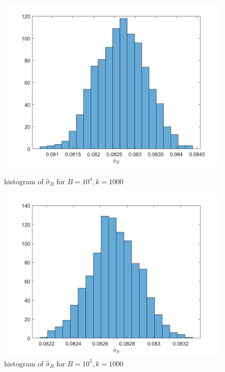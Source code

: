 \documentclass[10pt]{article}
\begin{document}
\begin{figure}[H]
    \begin{minipage}[b]{0.47\linewidth}
            \centering
            \includegraphics[width=\textwidth]{files/q3,b=10^4.png}
            \caption{histogram of $\hat{\sigma}_B$ for $B=10^4,k=1000$}
        \end{minipage}
        \hfill
        \begin{minipage}[b]{0.47\linewidth}
            \centering
            \includegraphics[width=\textwidth]{files/q3,b=10^5.png}
            \caption{histogram of $\hat{\sigma}_B$ for $B=10^5,k=1000$}
        \end{minipage}
\end{figure}
\end{document}
